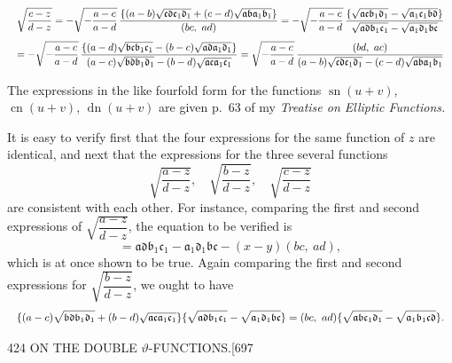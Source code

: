 \documentclass[11pt]{article}
\begin{document}
\[ \resizebox{\textwidth}{!}{$\displaystyle \sqrt{\frac{c-z}{d-z}} = -\sqrt{-\frac{a-c}{a-d}}\,\frac{\{(a-b)\sqrt{\mathfrak{c}\mathfrak{d}\mathfrak{c}_{1}\mathfrak{d}_{1}} + (c-d)\sqrt{\mathfrak{a}\mathfrak{b}\mathfrak{a}_{1}\mathfrak{b}_{1}}\}}{(bc,\ ad)} = -\sqrt{-\frac{a-c}{a-d}}\,\frac{\{\sqrt{\mathfrak{a}\mathfrak{c}\mathfrak{b}_{1}\mathfrak{d}_{1}} - \sqrt{\mathfrak{a}_{1}\mathfrak{c}_{1}\mathfrak{b}\mathfrak{d}}\}}{\sqrt{\mathfrak{a}\mathfrak{d}\mathfrak{b}_{1}\mathfrak{c}_{1}} - \sqrt{\mathfrak{a}_{1}\mathfrak{d}_{1}\mathfrak{b}\mathfrak{c}}}$} \]
\[ \resizebox{\textwidth}{!}{$\displaystyle = -\sqrt{-\frac{a-c}{a-d}}\,\frac{\{(a-d)\sqrt{\mathfrak{b}\mathfrak{c}\mathfrak{b}_{1}\mathfrak{c}_{1}} - (b-c)\sqrt{\mathfrak{a}\mathfrak{d}\mathfrak{a}_{1}\mathfrak{d}_{1}}\}}{(a-c)\sqrt{\mathfrak{b}\mathfrak{d}\mathfrak{b}_{1}\mathfrak{d}_{1}} - (b-d)\sqrt{\mathfrak{a}\mathfrak{c}\mathfrak{a}_{1}\mathfrak{c}_{1}}} = \sqrt{-\frac{a-c}{a-d}}\,\frac{(bd,\ ac)}{(a-b)\sqrt{\mathfrak{c}\mathfrak{d}\mathfrak{c}_{1}\mathfrak{d}_{1}} - (c-d)\sqrt{\mathfrak{a}\mathfrak{b}\mathfrak{a}_{1}\mathfrak{b}_{1}}}$} \]

The expressions in the like fourfold form for the functions $\operatorname{sn}(u + v)$, $\operatorname{cn}(u + v)$, $\operatorname{dn}(u + v)$ are given p.~63 of my \textit{Treatise on Elliptic Functions.}

It is easy to verify first that the four expressions for the same function of $z$ are identical, and next that the expressions for the three several functions
\[ \sqrt{\frac{a-z}{d-z}},\quad \sqrt{\frac{b-z}{d-z}},\quad \sqrt{\frac{c-z}{d-z}} \]
are consistent with each other. For instance, comparing the first and second expressions of $\sqrt{\dfrac{a-z}{d-z}}$, the equation to be verified is
\[ = \mathfrak{a}\mathfrak{d}\mathfrak{b}_{1}\mathfrak{c}_{1} - \mathfrak{a}_{1}\mathfrak{d}_{1}\mathfrak{b}\mathfrak{c} - (x-y)(bc,\ ad), \]
which is at once shown to be true. Again comparing the first and second expressions for $\sqrt{\dfrac{b-z}{d-z}}$, we ought to have
\[ \resizebox{\textwidth}{!}{$\displaystyle \{(a-c)\sqrt{\mathfrak{b}\mathfrak{d}\mathfrak{b}_{1}\mathfrak{d}_{1}} + (b-d)\sqrt{\mathfrak{a}\mathfrak{c}\mathfrak{a}_{1}\mathfrak{c}_{1}}\}\{\sqrt{\mathfrak{a}\mathfrak{d}\mathfrak{b}_{1}\mathfrak{c}_{1}} - \sqrt{\mathfrak{a}_{1}\mathfrak{d}_{1}\mathfrak{b}\mathfrak{c}}\} = (bc,\ ad)\{\sqrt{\mathfrak{a}\mathfrak{b}\mathfrak{c}_{1}\mathfrak{d}_{1}} - \sqrt{\mathfrak{a}_{1}\mathfrak{b}_{1}\mathfrak{c}\mathfrak{d}}\}.$} \]

\clearpage
\begin{center}\small 424 \hfill ON THE DOUBLE $\vartheta$-FUNCTIONS.\hfill [697\end{center}
\end{document}
